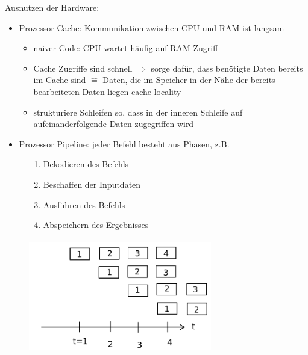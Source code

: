 \begin{itemize}
        Ausnutzen der Hardware:
        \begin{itemize}
            \item Prozessor Cache: Kommunikation zwischen CPU und RAM ist langsam
            \begin{itemize}[label={$\Rightarrow$}]
                \item naiver Code: CPU wartet häufig auf RAM-Zugriff
                \item Cache Zugriffe sind schnell  $\Rightarrow$ sorge dafür, dass benötigte Daten bereits im Cache sind $\widehat{=}$ Daten, die im Speicher in der Nähe der bereits bearbeiteten Daten liegen \glqq cache locality\grqq
                \item strukturiere Schleifen so, dass in der inneren Schleife auf aufeinanderfolgende Daten zugegriffen wird
            \end{itemize}
            \item Prozessor Pipeline: jeder Befehl besteht aus Phasen, z.B.
        \end{itemize}
    \end{itemize}
    \begin{figure}[htbp]
        \begin{minipage}[t]{7cm}
            \vspace*{-2cm}
            \begin{enumerate}
                \item Dekodieren des Befehls
                \item Beschaffen der Inputdaten
                \item Ausführen des Befehls
                \item Abspeichern des Ergebnisses
            \end{enumerate}
        \end{minipage}
        \begin{minipage}{6cm}
        \includegraphics[width=8cm,height=5cm,keepaspectratio]{./Pictures/Pipeline.png}
        \end{minipage}
    \end{figure}
